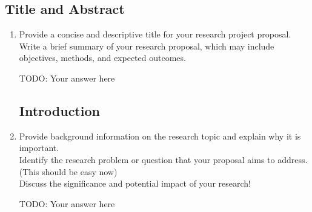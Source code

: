 \documentclass[letterpaper,11pt]{article}
\begin{document}
\subsection{Title and Abstract}
\begin{enumerate}
    \item 
    Provide a concise and descriptive title for your research project proposal. \\
    Write a brief summary of your research proposal, which may include objectives, methods, and expected outcomes.
    \begin{tcolorbox}
TODO: Your answer here
\newline
\newline
\newline
\newline
\newline
\newline
\newline
\newline
\newline
\newline
\newline
\end{tcolorbox}

\subsection{Introduction}
\item 
    Provide background information on the research topic and explain why it is important. \\
    Identify the research problem or question that your proposal aims to address. (This should be easy now) \\
    Discuss the significance and potential impact of your research! \\
\begin{tcolorbox}
TODO: Your answer here
\newline
\newline
\newline
\newline
\newline
\newline
\newline
\newline
\newline
\end{tcolorbox}


\end{enumerate}
\end{document}
